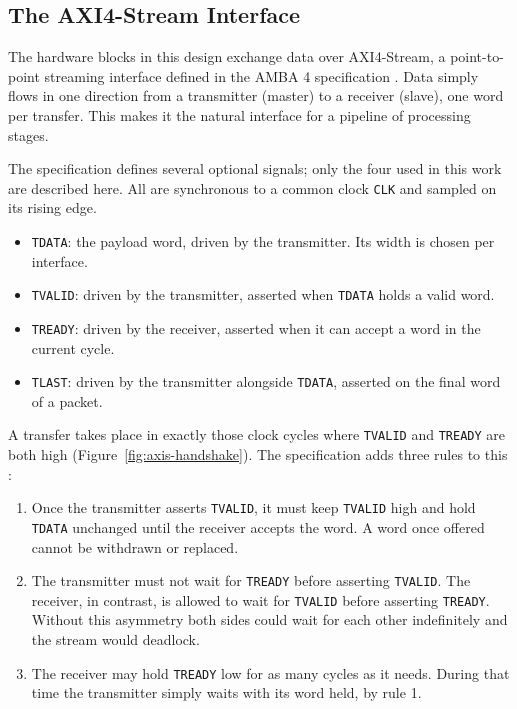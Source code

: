 \documentclass[12pt,a4paper]{article}
\begin{document}
\subsection{The AXI4-Stream Interface}
\label{sec:axis-fundamentals}

The hardware blocks in this design exchange data over AXI4-Stream,
a point-to-point streaming interface defined in the AMBA 4
specification \citep{arm_ihi0051a}. Data simply flows
in one direction from a transmitter (master) to a receiver (slave),
one word per transfer. This makes it the natural interface for a
pipeline of processing stages.

The specification defines several optional signals; only the four
used in this work are described here. All are synchronous to a
common clock \texttt{CLK} and sampled on its rising edge.

\begin{itemize}
  \item \texttt{TDATA}: the payload word, driven by the transmitter.
        Its width is chosen per interface.
  \item \texttt{TVALID}: driven by the transmitter, asserted when
        \texttt{TDATA} holds a valid word.
  \item \texttt{TREADY}: driven by the receiver, asserted when it
        can accept a word in the current cycle.
  \item \texttt{TLAST}: driven by the transmitter alongside
        \texttt{TDATA}, asserted on the final word of a packet.
\end{itemize}

A transfer takes place in exactly those clock cycles where
\texttt{TVALID} and \texttt{TREADY} are both high
(Figure~\ref{fig:axis-handshake}). The specification adds three
rules to this \citep{arm_ihi0051a}:

\begin{enumerate}
  \item Once the transmitter asserts \texttt{TVALID}, it must keep
        \texttt{TVALID} high and hold \texttt{TDATA} unchanged until
        the receiver accepts the word. A word once offered cannot be
        withdrawn or replaced.
  \item The transmitter must not wait for \texttt{TREADY} before
        asserting \texttt{TVALID}. The receiver, in contrast, is
        allowed to wait for \texttt{TVALID} before asserting
        \texttt{TREADY}. Without this asymmetry both sides could
        wait for each other indefinitely and the stream would
        deadlock.
  \item The receiver may hold \texttt{TREADY} low for as many
        cycles as it needs. During that time the transmitter simply
        waits with its word held, by rule 1.
\end{enumerate}
\end{document}
